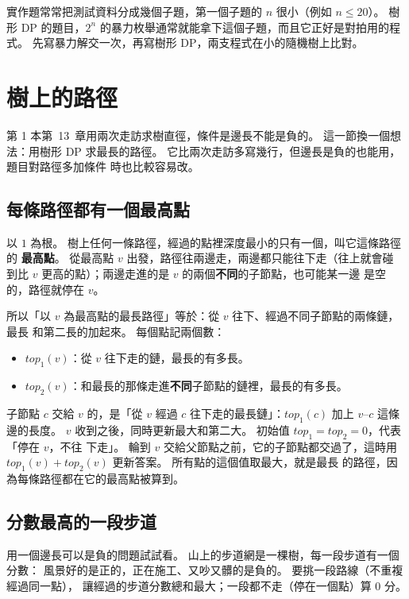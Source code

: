 \begin{apcsnote}
實作題常常把測試資料分成幾個子題，第一個子題的 $n$ 很小（例如 $n \le 20$）。 樹
形 DP 的題目，$2^n$ 的暴力枚舉通常就能拿下這個子題，而且它正好是對拍用的程式。
先寫暴力解交一次，再寫樹形 DP，兩支程式在小的隨機樹上比對。
\end{apcsnote}

\section{樹上的路徑}
\label{sec:tdp-path}

第 1 本第~13~章用兩次走訪求樹直徑，條件是邊長不能是負的。 這一節換一個想法：用樹形
DP 求最長的路徑。 它比兩次走訪多寫幾行，但邊長是負的也能用，題目對路徑多加條件
時也比較容易改。

\subsection{每條路徑都有一個最高點}

以 $1$ 為根。 樹上任何一條路徑，經過的點裡深度最小的只有一個，叫它這條路徑的
\textbf{最高點}。 從最高點 $v$ 出發，路徑往兩邊走，兩邊都只能往下走（往上就會碰
到比 $v$ 更高的點）；兩邊走進的是 $v$ 的兩個\textbf{不同}的子節點，也可能某一邊
是空的，路徑就停在 $v$。

所以「以 $v$ 為最高點的最長路徑」等於：從 $v$ 往下、經過不同子節點的兩條鏈，最長
和第二長的加起來。 每個點記兩個數：

\begin{itemize}
\item $\mathit{top}_1(v)$：從 $v$ 往下走的鏈，最長的有多長。
\item $\mathit{top}_2(v)$：和最長的那條走進\textbf{不同}子節點的鏈裡，最長的有多長。
\end{itemize}

子節點 $c$ 交給 $v$ 的，是「從 $v$ 經過 $c$ 往下走的最長鏈」：$\mathit{top}_1(c)$
加上 $v$--$c$ 這條邊的長度。 $v$ 收到之後，同時更新最大和第二大。 初始值 $\mathit{top}_1 = \mathit{top}_2 = 0$，代表「停在 $v$，不往
下走」。 輪到 $v$ 交給父節點之前，它的子節點都交過了，這時用
$\mathit{top}_1(v) + \mathit{top}_2(v)$ 更新答案。 所有點的這個值取最大，就是最長
的路徑，因為每條路徑都在它的最高點被算到。

\subsection{分數最高的一段步道}

用一個邊長可以是負的問題試試看。 山上的步道網是一棵樹，每一段步道有一個分數：
風景好的是正的，正在施工、又吵又髒的是負的。 要挑一段路線（不重複經過同一點），
讓經過的步道分數總和最大；一段都不走（停在一個點）算 $0$ 分。

